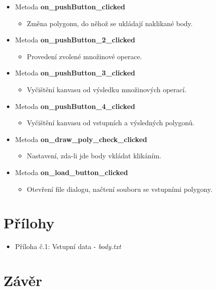 \documentclass[a4paper, 12pt]{article}
\begin{document}
\begin{itemize}
	\item Metoda \textbf{on\_pushButton\_clicked}
		\begin{itemize}
			\item Změna polygonu, do něhož se ukládají naklikané body.
		\end{itemize}
	\item Metoda \textbf{on\_pushButton\_2\_clicked}
		\begin{itemize}
			\item Provedení zvolené množinové operace.
		\end{itemize}
	\item Metoda \textbf{on\_pushButton\_3\_clicked}
		\begin{itemize}
			\item Vyčištění kanvasu od výsledku množinových operací.
		\end{itemize}
	\item Metoda \textbf{on\_pushButton\_4\_clicked}
		\begin{itemize}
			\item Vyčištění kanvasu od vstupních a výsledných polygonů.
		\end{itemize}
	\item Metoda \textbf{on\_draw\_poly\_check\_clicked}
		\begin{itemize}
			\item Nastavení, zda-li jde body vkládat klikáním.
		\end{itemize}
	\item Metoda \textbf{on\_load\_button\_clicked}
		\begin{itemize}
			\item Otevření file dialogu, načtení souboru se vstupními polygony.
		\end{itemize}
\end{itemize} 

\clearpage

\section{Přílohy}

\begin{itemize}
	\item Příloha č.1: Vstupní data - \textit{body.txt}
\end{itemize}

\section{Závěr}
\end{document}
